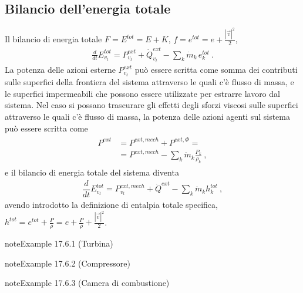 \documentclass[letterpaper,10pt,italian]{jupyterBook}
\begin{document}
\subsection{Bilancio dell’energia totale}
\label{\detokenize{ch/thermodynamics/principles-open:bilancio-dell-energia-totale}}\label{\detokenize{ch/thermodynamics/principles-open:physics-hs-thermodynamics-foundation-principles-open-total-energy}}
\sphinxAtStartPar
Il bilancio di energia totale \(F = E^{tot} = E + K\), \(f = e^{tot} = e + \frac{|\vec{v}|^2}{2}\),
\begin{equation*}
\begin{split}\frac{d}{dt} E^{tot}_{v_t} = P^{ext}_{v_t}  + \dot{Q}^{ext}_{v_t}  - \sum_k \dot{m}_k \, e^{tot}_k \ .\end{split}
\end{equation*}
\sphinxAtStartPar
La potenza delle azioni esterne \(P^{ext}_{v_t}\) può essere scritta come somma dei contributi sulle superfici della frontiera del sistema attraverso le quali c’è flusso di massa, e le superfici impermeabili che possono essere utilizzate per estrarre lavoro dal sistema. Nel caso si possano trascurare gli effetti degli sforzi viscosi sulle superfici attraverso le quali c’è flusso di massa, la potenza delle azioni agenti sul sistema può essere scritta come
\begin{equation*}
\begin{split}\begin{aligned}
  P^{ext} & = P^{ext,mech} + P^{ext,\Phi} = \\
          & = P^{ext,mech} - \sum_{k} \dot{m}_k \frac{P_k}{\rho_k} \ , 
\end{aligned}\end{split}
\end{equation*}
\sphinxAtStartPar
e il bilancio di energia totale del sistema diventa
\begin{equation*}
\begin{split}\dfrac{d}{dt} E^{tot}_{v_t} = P^{ext,mech}_{v_t} + \dot{Q}^{ext} - \sum_k \dot{m}_k h^{tot}_k \ ,\end{split}
\end{equation*}
\sphinxAtStartPar
avendo introdotto la definizione di entalpia totale specifica, \(h^{tot} = e^{tot} + \frac{P}{\rho} = e + \frac{P}{\rho} + \frac{|\vec{v}|^2}{2}\).
\label{ch/thermodynamics/principles-open:thermodynamics:principles:open:ex:turbine}
\begin{sphinxadmonition}{note}{Example 17.6.1 (Turbina)}


\end{sphinxadmonition}
\label{ch/thermodynamics/principles-open:thermodynamics:principles:open:ex:compressor}
\begin{sphinxadmonition}{note}{Example 17.6.2 (Compressore)}


\end{sphinxadmonition}
\label{ch/thermodynamics/principles-open:thermodynamics:principles:open:ex:comb-chamber}
\begin{sphinxadmonition}{note}{Example 17.6.3 (Camera di combustione)}


\end{sphinxadmonition}
\end{document}
